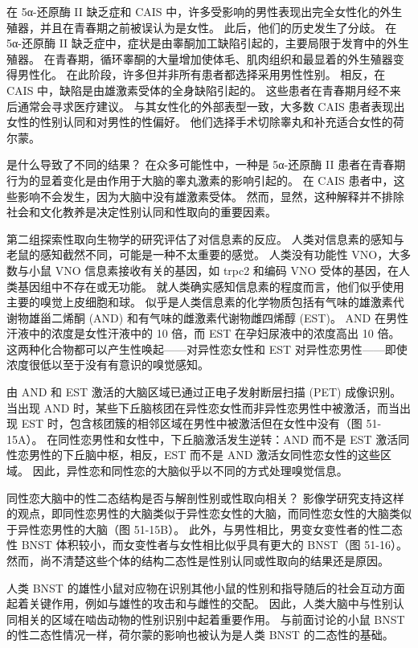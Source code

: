 在 5α-还原酶 II 缺乏症和 CAIS 中，许多受影响的男性表现出完全女性化的外生殖器，并且在青春期之前被误认为是女性。 此后，他们的历史发生了分歧。 在 5α-还原酶 II 缺乏症中，症状是由睾酮加工缺陷引起的，主要局限于发育中的外生殖器。 在青春期，循环睾酮的大量增加使体毛、肌肉组织和最显着的外生殖器变得男性化。 在此阶段，许多但并非所有患者都选择采用男性性别。 相反，在 CAIS 中，缺陷是由雄激素受体的全身缺陷引起的。 这些患者在青春期月经不来后通常会寻求医疗建议。 与其女性化的外部表型一致，大多数 CAIS 患者表现出女性的性别认同和对男性的性偏好。 他们选择手术切除睾丸和补充适合女性的荷尔蒙。

是什么导致了不同的结果？ 在众多可能性中，一种是 5α-还原酶 II 患者在青春期行为的显着变化是由作用于大脑的睾丸激素的影响引起的。 在 CAIS 患者中，这些影响不会发生，因为大脑中没有雄激素受体。 然而，显然，这种解释并不排除社会和文化教养是决定性别认同和性取向的重要因素。

第二组探索性取向生物学的研究评估了对信息素的反应。 人类对信息素的感知与老鼠的感知截然不同，可能是一种不太重要的感觉。 人类没有功能性 VNO，大多数与小鼠 VNO 信息素接收有关的基因，如 trpc2 和编码 VNO 受体的基因，在人类基因组中不存在或无功能。 就人类确实感知信息素的程度而言，他们似乎使用主要的嗅觉上皮细胞和球。 似乎是人类信息素的化学物质包括有气味的雄激素代谢物雄甾二烯酮 (AND) 和有气味的雌激素代谢物雌四烯醇 (EST)。 AND 在男性汗液中的浓度是女性汗液中的 10 倍，而 EST 在孕妇尿液中的浓度高出 10 倍。 这两种化合物都可以产生性唤起——对异性恋女性和 EST 对异性恋男性——即使浓度很低以至于没有有意识的嗅觉感知。

由 AND 和 EST 激活的大脑区域已通过正电子发射断层扫描 (PET) 成像识别。 当出现 AND 时，某些下丘脑核团在异性恋女性而非异性恋男性中被激活，而当出现 EST 时，包含核团簇的相邻区域在男性中被激活但在女性中没有（图 51-15A）。 在同性恋男性和女性中，下丘脑激活发生逆转：AND 而不是 EST 激活同性恋男性的下丘脑中枢，相反，EST 而不是 AND 激活女同性恋女性的这些区域。 因此，异性恋和同性恋的大脑似乎以不同的方式处理嗅觉信息。

同性恋大脑中的性二态结构是否与解剖性别或性取向相关？ 影像学研究支持这样的观点，即同性恋男性的大脑类似于异性恋女性的大脑，而同性恋女性的大脑类似于异性恋男性的大脑（图 51-15B）。 此外，与男性相比，男变女变性者的性二态性 BNST 体积较小，而女变性者与女性相比似乎具有更大的 BNST（图 51-16）。 然而，尚不清楚这些个体的结构二态性是性别认同或性取向的结果还是原因。

人类 BNST 的雄性小鼠对应物在识别其他小鼠的性别和指导随后的社会互动方面起着关键作用，例如与雄性的攻击和与雌性的交配。 因此，人类大脑中与性别认同相关的区域在啮齿动物的性别识别中起着重要作用。 与前面讨论的小鼠 BNST 的性二态性情况一样，荷尔蒙的影响也被认为是人类 BNST 的二态性的基础。

